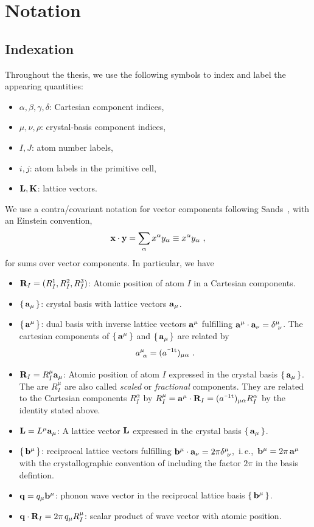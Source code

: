 \chapter{Notation}
\label{app:notation}

\section{Indexation}
Throughout the thesis, we use the following symbols to index and label the appearing quantities:
\begin{itemize}
\item $\alpha, \beta, \gamma, \delta$: Cartesian component indices,
\item $\mu, \nu, \rho$: crystal-basis component indices,
\item $I, J$: atom number labels,
\item $i, j$: atom labels in the primitive cell,
\item ${\bf L}, {\bf K}$: lattice vectors.
\end{itemize}
We use a contra/covariant notation for vector components following Sands~\cite{Sands2002}, with an Einstein convention,
$$
{\bf x} \cdot {\bf y} = \sum_\alpha x^\alpha y_\alpha \equiv x^\alpha y_\alpha~,
$$
for sums over vector components. In particular, we have
\begin{itemize}
	\item ${\bf R}_I = (R^1_I, R^2_I, R^3_I)$: Atomic position of atom $I$ in a Cartesian components.
	\item $\set{{\bf a}_\mu}$: crystal basis with lattice vectors ${\bf a}_\mu$.
	\item $\set{{\bf a}^\mu}$: dual basis with inverse lattice vectors ${\bf a}^\mu$ fulfilling ${\bf a}^\mu \cdot {\bf a}_\nu = \delta^\mu_{~\nu}$. The cartesian components of $\set{{\bf a}^\mu}$ and $\set{{\bf a}_\mu}$ are related by
	$$ a^{\mu}_{~\alpha} = (\itp a)_{\mu \alpha} ~.$$
	\item ${\bf R}_I = R^\mu_I {\bf a}_\mu$: Atomic position of atom $I$ expressed in the crystal basis $\set{{\bf a}_\mu}$. The are $R_I^\mu$ are also called \emph{scaled} or \emph{fractional} components. They are related to the Cartesian components $R_I^\alpha$ by $R_I^\mu = {\bf a}^\mu \cdot {\bf R}_I = (\itp a)_{\mu \alpha} R_I^{\alpha}$ by the identity stated above.
	\item ${\bf L} = L^\mu {\bf a}_\mu$: A lattice vector $\bf L$ expressed in the crystal basis $\set{{\bf a}_\mu}$. 
	\item $\set{{\bf b}^\mu}$: reciprocal lattice vectors fulfilling ${\bf b}^\mu \cdot {\bf a}_\nu = 2 \pi \delta^\mu_{~\nu}$,~i.\,e.,~${\bf b}^\mu = 2\pi\,{\bf a}^\mu$ with the crystallographic convention of including the factor $2 \pi$ in the basis defintion.
	\item ${\bf q} = q_\mu {\bf b}^\mu$: phonon wave vector in the reciprocal lattice basis $\set{{\bf b}^\mu}$.
	\item ${\bf q} \cdot {\bf R}_I = 2 \pi \, q_\mu R^\mu_I$: scalar product of wave vector with atomic position.
\end{itemize}
